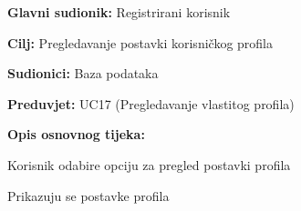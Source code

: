 					\noindent {}
					\begin{packed_item}
						
						\item \textbf{Glavni sudionik: }Registrirani korisnik
						\item \textbf{Cilj: }Pregledavanje postavki korisničkog profila
						\item \textbf{Sudionici: }Baza podataka
						\item \textbf{Preduvjet: }UC17 (Pregledavanje vlastitog profila)
						\item \textbf{Opis osnovnog tijeka:}
						
						\item[] \begin{packed_enum}
							\item Korisnik odabire opciju za pregled postavki profila
							\item Prikazuju se postavke profila
						\end{packed_enum}
					\end{packed_item}
										
